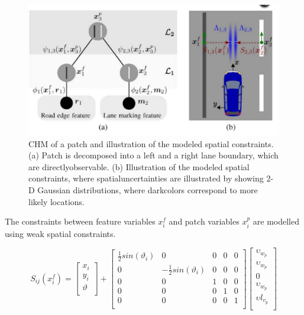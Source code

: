 \begin{figure}[H]
	\centering
    \includegraphics[scale = 0.4]{pictures/patch.pdf}
	\caption{CHM of a patch and illustration of the modeled spatial constraints.(a) Patch is decomposed into a left and a right lane boundary, which are directlyobservable. (b) Illustration of the modeled spatial constraints, where spatialuncertainties are illustrated by showing 2-D Gaussian distributions, where darkcolors correspond to more likely locations.\cite{lanesystem}}
	\label{fig11}
\end{figure}

The constraints between feature variables $x^f_i$ and patch variables $x^p_i$ are modelled using weak spatial constraints. 

\begin{equation}
\label{eq5}
S_{ij}(x_i^f) = \begin{bmatrix}
x_i \\
y_i \\
\vartheta \\
\end{bmatrix}
+ \begin{bmatrix}
\frac{1}{2}sin(\vartheta_i) & 0 & 0 & 0 & 0 \\
0 & -\frac{1}{2}sin(\vartheta_i) & 0 &0 & 0 \\
0 & 0 & 1 & 0 & 0 \\
0 & 0 & 0 & 1 & 0 \\
0 & 0 & 0 & 0 & 1 \\
\end{bmatrix}
\begin{bmatrix}
\upsilon_{w_p} \\
\upsilon_{w_p} \\
0 \\
\upsilon_{w_p} \\
\upsilon l_{v_p} \\
\end{bmatrix}
\end{equation}

